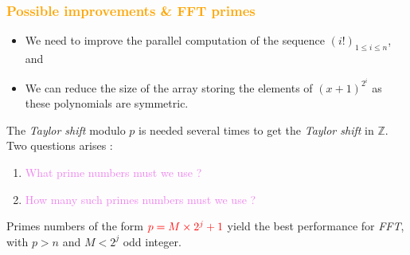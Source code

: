 \begin{frame}[fragile]
\frametitle{\textbf{\textcolor{orange}{Possible improvements \& FFT primes}}}

\begin{block}{}
\begin{itemize}
\item We need to improve the parallel computation of the sequence $(i!)_{1 \leq i \leq n}$, and
\item We can reduce the size of the array storing the elements of $(x+1)^{2^i}$ as these polynomials are symmetric.
\end{itemize}
\end{block}

\begin{block}{}
The \textit{Taylor shift} modulo $p$ is needed several times to get the \textit{Taylor shift} in $\mathbb{Z}$. Two questions arises :
\vspace{3mm}
\begin{enumerate}
\item \textcolor{violet}{What prime numbers must we use ?}
\item \textcolor{violet}{How many such primes numbers must we use ?}
\end{enumerate}
\end{block}

\begin{block}{}
Primes numbers of the form $\textcolor{red}{p = M \times 2^j + 1}$ yield the best performance for \textit{FFT}, with $p>n$ and $M<2^j$ odd integer.
\end{block}


\end{frame}

